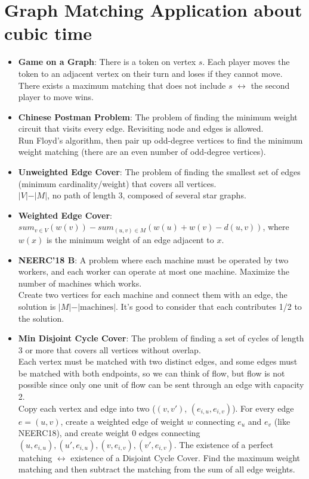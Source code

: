 \section{Graph Matching Application about cubic time}
\begin{itemize}
    \setlength\itemsep{0.1em}
    \item \textbf{Game on a Graph}: There is a token on vertex $s$. Each player moves the token to an adjacent vertex on their turn and loses if they cannot move.\\
    There exists a maximum matching that does not include $s$ $\leftrightarrow$ the second player to move wins.
    \item \textbf{Chinese Postman Problem}: The problem of finding the minimum weight circuit that visits every edge. Revisiting node and edges is allowed. \\
    Run Floyd's algorithm, then pair up odd-degree vertices to find the minimum weight matching (there are an even number of odd-degree vertices).
    \item \textbf{Unweighted Edge Cover}: The problem of finding the smallest set of edges (minimum cardinality/weight) that covers all vertices.\\
    $\vert V\vert - \vert M\vert$, no path of length 3, composed of several star graphs.
    \item \textbf{Weighted Edge Cover}: $sum_{v \in V}(w(v)) - sum_{(u,v) \in M}(w(u) + w(v) - d(u,v))$, where $w(x)$ is the minimum weight of an edge adjacent to $x$.
    \item \textbf{NEERC'18 B}: A problem where each machine must be operated by two workers, and each worker can operate at most one machine. Maximize the number of machines which works. \\
    Create two vertices for each machine and connect them with an edge, the solution is $\vert M\vert - \vert\text{machines}\vert$. It's good to consider that each contributes 1/2 to the solution.
    \item \textbf{Min Disjoint Cycle Cover}: The problem of finding a set of cycles of length 3 or more that covers all vertices without overlap.\\
    Each vertex must be matched with two distinct edges, and some edges must be matched with both endpoints, so we can think of flow, but flow is not possible since only one unit of flow can be sent through an edge with capacity 2.\\
    Copy each vertex and edge into two ($(v, v')$, $(e_{i,u},e_{i,v})$). For every edge $e=(u,v)$, create a weighted edge of weight $w$ connecting $e_u$ and $e_v$ (like NEERC18), and create weight 0 edges connecting $(u,e_{i,u}), (u',e_{i,u}), (v,e_{i,v}), (v',e_{i,v})$. The existence of a perfect matching $\leftrightarrow$ existence of a Disjoint Cycle Cover. Find the maximum weight matching and then subtract the matching from the sum of all edge weights.

\end{itemize}
